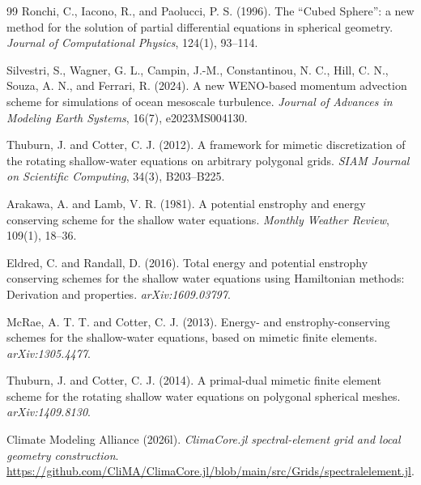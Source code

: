 \documentclass[11pt]{article}
\begin{document}
\begin{thebibliography}{99}
Ronchi, C., Iacono, R., and Paolucci, P. S. (1996).
The ``Cubed Sphere'': a new method for the solution of partial differential equations in spherical geometry.
\emph{Journal of Computational Physics}, 124(1), 93--114.

Silvestri, S., Wagner, G. L., Campin, J.-M., Constantinou, N. C., Hill, C. N., Souza, A. N., and Ferrari, R. (2024).
A new WENO-based momentum advection scheme for simulations of ocean mesoscale turbulence.
\emph{Journal of Advances in Modeling Earth Systems}, 16(7), e2023MS004130.

Thuburn, J. and Cotter, C. J. (2012).
A framework for mimetic discretization of the rotating shallow-water equations on arbitrary polygonal grids.
\emph{SIAM Journal on Scientific Computing}, 34(3), B203--B225.


Arakawa, A. and Lamb, V. R. (1981).
A potential enstrophy and energy conserving scheme for the shallow water equations.
\emph{Monthly Weather Review}, 109(1), 18--36.

Eldred, C. and Randall, D. (2016).
Total energy and potential enstrophy conserving schemes for the shallow water equations using Hamiltonian methods: Derivation and properties.
\emph{arXiv:1609.03797}.

McRae, A. T. T. and Cotter, C. J. (2013).
Energy- and enstrophy-conserving schemes for the shallow-water equations, based on mimetic finite elements.
\emph{arXiv:1305.4477}.

Thuburn, J. and Cotter, C. J. (2014).
A primal-dual mimetic finite element scheme for the rotating shallow water equations on polygonal spherical meshes.
\emph{arXiv:1409.8130}.

Climate Modeling Alliance (2026l).
\emph{ClimaCore.jl spectral-element grid and local geometry construction}.
\url{https://github.com/CliMA/ClimaCore.jl/blob/main/src/Grids/spectralelement.jl}.

\end{thebibliography}
\end{document}
